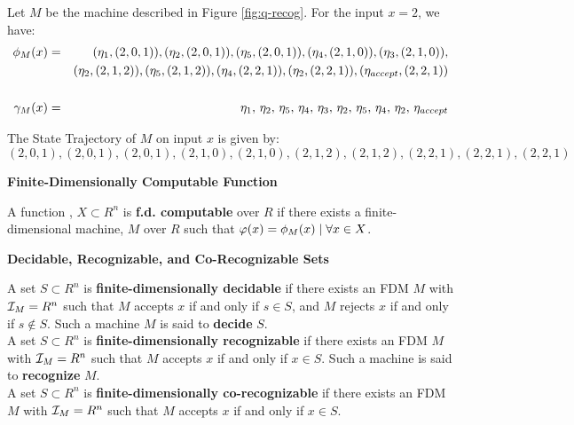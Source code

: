 
\begin{example}
  Let $M$ be the machine described in Figure \ref{fig:q-recog}. For
  the input $x = 2$, we have:
  \begin{eqnarray*}
    \phi_M(x) &=& (\eta_1, (2,0,1)), (\eta_2, (2,0,1)), (\eta_5, (2,0,1)), (\eta_4, (2,1,0)), (\eta_3, (2,1,0)),\\
    &&  (\eta_2, (2,1,2)), (\eta_5, (2,1,2)), (\eta_4, (2,2,1)), (\eta_2, (2,2,1)), (\eta_{accept}, (2,2,1))\\
    && \\
    \gamma_M(x) &=& \eta_1,\, \eta_2,\, \eta_5,\, \eta_4,\, \eta_3,\, \eta_2,\, \eta_5,\, \eta_4,\, \eta_2,\, \eta_{accept}
  \end{eqnarray*}

  The State Trajectory of $M$ on input $x$ is given by:
  $$(2,0,1), (2,0,1), (2,0,1), (2,1,0), (2,1,0), (2,1,2), (2,1,2), (2,2,1), (2,2,1), (2,2,1)$$
\end{example}

\begin{definition}{\textbf{Finite-Dimensionally Computable Function}}
  
  A function , $X \subset R^n$ is
  \textbf{f.d. computable} over $R$ if there exists a
  finite-dimensional machine, $M$ over $R$ such that $\varphi(x) =
  \phi_M(x) \mid \forall x \in X$.
  
\end{definition}

\begin{definition}{\textbf{Decidable, Recognizable, and Co-Recognizable Sets}}
  
  A set $S \subset R^n$ is \textbf{finite-dimensionally decidable} if
  there exists an FDM $M$ with $\mathcal{I}_M = R^n$ such that $M$
  accepts $x$ if and only if $s \in S$, and $M$ rejects $x$ if and
  only if $s \notin S$.  Such a machine $M$ is said to \textbf{decide}
  $S$.\\

  A set $S \subset R^n$ is \textbf{finite-dimensionally recognizable}
  if there exists an FDM $M$ with $\mathcal{I}_M = R^n$ such that $M$
  accepts $x$ if and only if $x \in S$.  Such a machine is said to
  \textbf{recognize} $M$.\\

  A set $S \subset R^n$ is \textbf{finite-dimensionally
    co-recognizable} if there exists an FDM $M$ with $\mathcal{I}_M =
  R^n$ such that $M$ accepts $x$ if and only if $x \in S$.
\end{definition}
  
